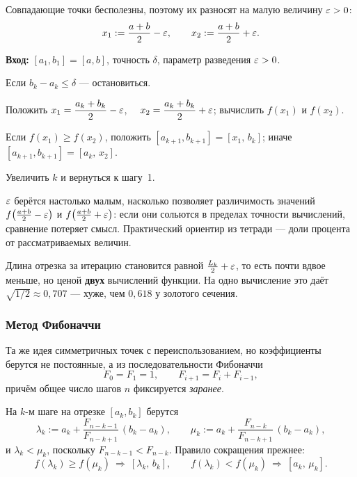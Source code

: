 Совпадающие точки бесполезны, поэтому их разносят на малую величину
$\varepsilon > 0$:
\[
  x_1 := \frac{a+b}{2} - \varepsilon , \qquad
  x_2 := \frac{a+b}{2} + \varepsilon .
\]

\begin{algo}[title={Метод дихотомии}]
\textbf{Вход:} $[a_1,b_1] = [a,b]$, точность $\delta$, параметр разведения
$\varepsilon > 0$.

\begin{steps}
  \item Если $b_k - a_k \le \delta$ — остановиться.
  \item Положить
        $x_1 = \dfrac{a_k+b_k}{2} - \varepsilon$, \ \
        $x_2 = \dfrac{a_k+b_k}{2} + \varepsilon$;
        вычислить $f(x_1)$ и $f(x_2)$.
  \item Если $f(x_1) \ge f(x_2)$, положить $[a_{k+1},b_{k+1}] = [x_1,\, b_k]$;
        иначе $[a_{k+1},b_{k+1}] = [a_k,\, x_2]$.
  \item Увеличить $k$ и вернуться к шагу~1.
\end{steps}
\end{algo}

\begin{remark}
$\varepsilon$ берётся настолько малым, насколько позволяет различимость значений
$f\!\left(\tfrac{a+b}{2} - \varepsilon\right)$ и
$f\!\left(\tfrac{a+b}{2} + \varepsilon\right)$: если они сольются в пределах точности
вычислений, сравнение потеряет смысл. Практический ориентир из тетради — доли
процента от рассматриваемых величин.
\end{remark}

\begin{idea}
Длина отрезка за итерацию становится равной $\tfrac{L_k}{2} + \varepsilon$, то есть
почти вдвое меньше, но ценой \textbf{двух} вычислений функции. На одно
вычисление это даёт $\sqrt{1/2} \approx 0{,}707$ — хуже, чем $0{,}618$ у
золотого сечения.
\end{idea}

\subsubsection*{Метод Фибоначчи}

Та же идея симметричных точек с переиспользованием, но коэффициенты берутся не
постоянные, а из последовательности Фибоначчи
\[
  F_0 = F_1 = 1, \qquad F_{i+1} = F_i + F_{i-1} ,
\]
причём общее число шагов $n$ фиксируется \emph{заранее}.

На $k$-м шаге на отрезке $[a_k, b_k]$ берутся
\[
  \lambda_k := a_k + \frac{F_{n-k-1}}{F_{n-k+1}}\,(b_k - a_k) ,
  \qquad
  \mu_k := a_k + \frac{F_{n-k}}{F_{n-k+1}}\,(b_k - a_k) ,
\]
и $\lambda_k < \mu_k$, поскольку $F_{n-k-1} < F_{n-k}$. Правило сокращения
прежнее:
\[
  f(\lambda_k) \ge f(\mu_k) \ \Longrightarrow\ [\lambda_k,\, b_k] ,
  \qquad
  f(\lambda_k) < f(\mu_k) \ \Longrightarrow\ [a_k,\, \mu_k] .
\]

